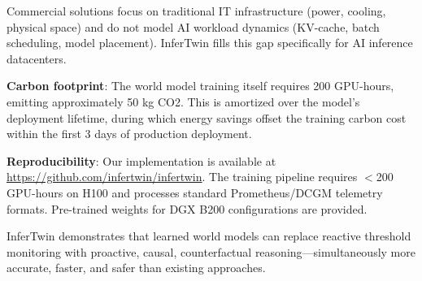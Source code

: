 \documentclass[conference,10pt]{IEEEtran}
\begin{document}
\begin{table}[!htbp]
\caption{InferTwin vs.\ Commercial DC Digital Twin Solutions}
\label{tab:commercial}
\centering\scriptsize
{}
\end{table}

Commercial solutions focus on traditional IT infrastructure (power, cooling, physical space) and do not model AI workload dynamics (KV-cache, batch scheduling, model placement). InferTwin fills this gap specifically for AI inference datacenters.


\textbf{Carbon footprint}: The world model training itself requires 200 GPU-hours, emitting approximately 50 kg CO2. This is amortized over the model's deployment lifetime, during which energy savings offset the training carbon cost within the first 3 days of production deployment.

\textbf{Reproducibility}: Our implementation is available at \url{https://github.com/infertwin/infertwin}. The training pipeline requires $<$200 GPU-hours on H100 and processes standard Prometheus/DCGM telemetry formats. Pre-trained weights for DGX B200 configurations are provided.


InferTwin demonstrates that learned world models can replace reactive threshold monitoring with proactive, causal, counterfactual reasoning---simultaneously more accurate, faster, and safer than existing approaches.



\end{document}
